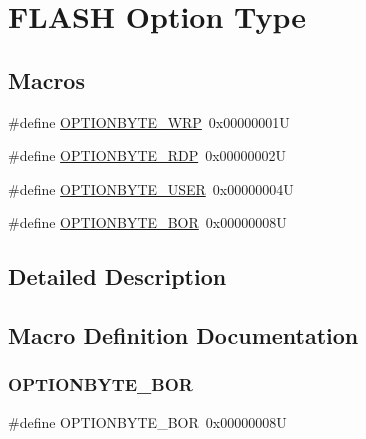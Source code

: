 \hypertarget{group___f_l_a_s_h_ex___option___type}{}\section{F\+L\+A\+SH Option Type}
\label{group___f_l_a_s_h_ex___option___type}
\subsection*{Macros}
\begin{DoxyCompactItemize}
\item 
\#define \mbox{\hyperlink{group___f_l_a_s_h_ex___option___type_ga48712a166ea192ddcda0f2653679f9ec}{O\+P\+T\+I\+O\+N\+B\+Y\+T\+E\+\_\+\+W\+RP}}~0x00000001U
\item 
\#define \mbox{\hyperlink{group___f_l_a_s_h_ex___option___type_ga8f0bdb21ef13bae39d5d8b6619e2df06}{O\+P\+T\+I\+O\+N\+B\+Y\+T\+E\+\_\+\+R\+DP}}~0x00000002U
\item 
\#define \mbox{\hyperlink{group___f_l_a_s_h_ex___option___type_gac7d843e666e15c79688a1914e8ffe7a5}{O\+P\+T\+I\+O\+N\+B\+Y\+T\+E\+\_\+\+U\+S\+ER}}~0x00000004U
\item 
\#define \mbox{\hyperlink{group___f_l_a_s_h_ex___option___type_gaf4063216c8386467d187663190936c07}{O\+P\+T\+I\+O\+N\+B\+Y\+T\+E\+\_\+\+B\+OR}}~0x00000008U
\end{DoxyCompactItemize}


\subsection{Detailed Description}


\subsection{Macro Definition Documentation}
\mbox{\label{group___f_l_a_s_h_ex___option___type_gaf4063216c8386467d187663190936c07}} 
\subsubsection{\texorpdfstring{O\+P\+T\+I\+O\+N\+B\+Y\+T\+E\+\_\+\+B\+OR}{OPTIONBYTE\_BOR}}
{\footnotesize\ttfamily \#define O\+P\+T\+I\+O\+N\+B\+Y\+T\+E\+\_\+\+B\+OR~0x00000008U}

